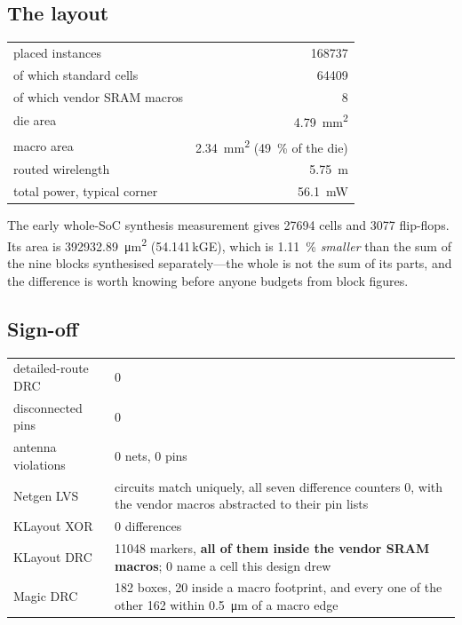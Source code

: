 \documentclass[11pt,a4paper]{article}
\begin{document}
\subsection{The layout}

\begin{center}
\begin{tabular}{lr}
\toprule
placed instances & \num{168737} \\
\quad of which standard cells & \num{64409} \\
\quad of which vendor SRAM macros & \num{8} \\
die area & \SI{4.79}{\milli\meter\squared} \\
macro area & \SI{2.34}{\milli\meter\squared} (\SI{49}{\percent} of the die) \\
routed wirelength & \SI{5.75}{\meter} \\
total power, typical corner & \SI{56.1}{\milli\watt} \\
\bottomrule
\end{tabular}
\end{center}

The early whole-SoC synthesis measurement gives \num{27694} cells
and \num{3077} flip-flops. Its area is \SI{392932.89}{\um\squared}
(\num{54.141}\,kGE), which is \SI{1.11}{\percent} \emph{smaller} than the
sum of the nine blocks synthesised separately---the whole is not the sum
of its parts, and the difference is worth knowing before anyone budgets
from block figures.

\subsection{Sign-off}

\begin{center}
\begin{tabular}{lL{8.4cm}}
\toprule
detailed-route DRC & \num{0} \\
disconnected pins & \num{0} \\
antenna violations & \num{0} nets, \num{0} pins \\
Netgen LVS & circuits match uniquely, all seven difference counters
  \num{0}, with the vendor macros abstracted to their pin lists \\
KLayout XOR & \num{0} differences \\
KLayout DRC & \num{11048} markers, \textbf{all of them inside the vendor
  SRAM macros}; \num{0} name a cell this design drew \\
Magic DRC & \num{182} boxes, \num{20} inside a macro footprint, and every
  one of the other \num{162} within \SI{0.5}{\um} of a macro
  edge \\
\bottomrule
\end{tabular}
\end{center}
\end{document}
